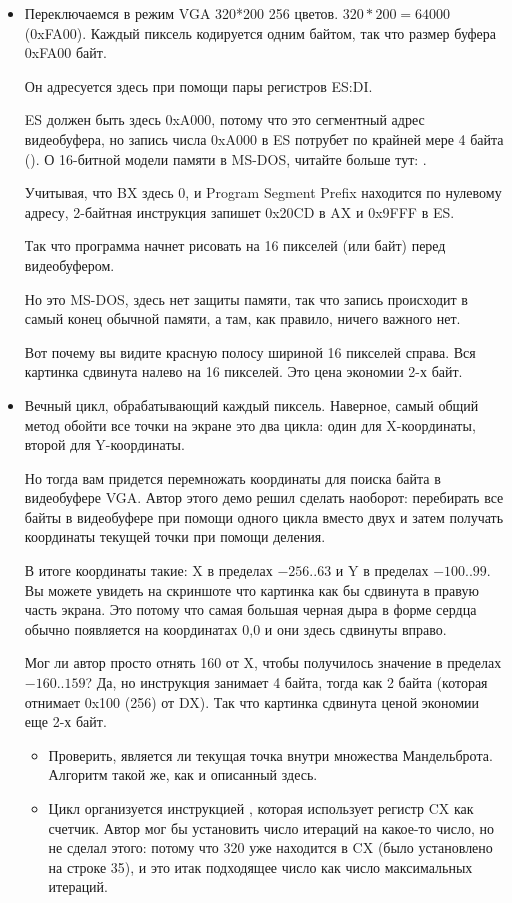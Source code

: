 \begin{itemize}
\item Переключаемся в режим VGA 320*200 256 цветов. 
$320*200=64000$ (0xFA00). 
Каждый пиксель кодируется одним байтом, так что размер буфера 0xFA00 байт.

Он адресуется здесь при помощи пары регистров ES:DI.

ES должен быть здесь 0xA000, потому что это сегментный адрес видеобуфера, но запись
числа 0xA000 в ES потрубет по крайней мере 4 байта (). 
О 16-битной модели памяти в MS-DOS, читайте больше тут: 
.

Учитывая, что BX здесь 0, и Program Segment Prefix находится по нулевому адресу, 2-байтная инструкция
 запишет 0x20CD в AX и 0x9FFF в ES.

Так что программа начнет рисовать на 16 пикселей (или байт) перед видеобуфером.

Но это MS-DOS, 
здесь нет защиты памяти, так что запись происходит в самый конец обычной памяти, а там, как правило, ничего важного нет.

Вот почему вы видите красную полосу шириной 16 пикселей справа.
Вся картинка сдвинута налево на 16 пикселей.
Это цена экономии 2-х байт.

\item Вечный цикл, обрабатывающий каждый пиксель.
Наверное, самый общий метод обойти все точки на экране это два цикла:
один для X-координаты, второй для Y-координаты.

Но тогда вам придется перемножать координаты для поиска байта в видеобуфере VGA.
Автор этого демо решил сделать наоборот: перебирать все байты в видеобуфере при помощи одного цикла
вместо двух и затем получать координаты текущей точки при помощи деления.

В итоге координаты такие: X в пределах $-256..63$ и Y 
в пределах $-100..99$.
Вы можете увидеть на скриншоте что картинка как бы сдвинута в правую часть экрана.
Это потому что самая большая черная дыра в форме сердца обычно появляется на координатах 0,0 и они
здесь сдвинуты вправо.

Мог ли автор просто отнять 160 от X, чтобы получилось значение в пределах $-160..159$? 
Да, но инструкция  занимает 4 байта, 
тогда как \EMDASH{}2 байта 
(которая отнимает 0x100 (256) от DX). 
Так что картинка сдвинута ценой экономии еще 2-х байт.

    \begin{itemize}
    \item Проверить, является ли текущая точка внутри множества Мандельброта.
          Алгоритм такой же, как и описанный здесь.
     \item Цикл организуется инструкцией , которая использует регистр CX как счетчик.
Автор мог бы установить число итераций на какое-то число, но не сделал этого: потому что 320 уже
находится в CX (было установлено на строке 35), и это итак подходящее число как число максимальных
итераций.


\end{itemize}
\end{itemize}
